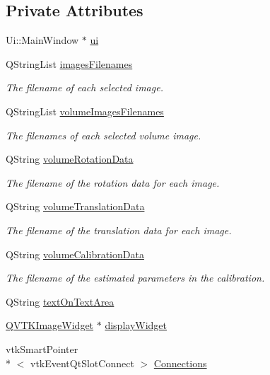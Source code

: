 \subsection*{Private Attributes}
\begin{DoxyCompactItemize}
\item 
Ui\-::\-Main\-Window $\ast$ \hyperlink{class_main_window_a35466a70ed47252a0191168126a352a5}{ui}
\item 
Q\-String\-List \hyperlink{class_main_window_a8b33f17919e8e99127a612476aefdaed}{images\-Filenames}
\begin{DoxyCompactList}\small\item\em The filename of each selected image. \end{DoxyCompactList}\item 
Q\-String\-List \hyperlink{class_main_window_a1a88d2961b59b38eb58bffeb1a6ffe39}{volume\-Images\-Filenames}
\begin{DoxyCompactList}\small\item\em The filenames of each selected volume image. \end{DoxyCompactList}\item 
Q\-String \hyperlink{class_main_window_ad2139711b6f91f541304b5dc5cf311ac}{volume\-Rotation\-Data}
\begin{DoxyCompactList}\small\item\em The filename of the rotation data for each image. \end{DoxyCompactList}\item 
Q\-String \hyperlink{class_main_window_aec94bc06393ad4a2fc014d71fbeddbd3}{volume\-Translation\-Data}
\begin{DoxyCompactList}\small\item\em The filename of the translation data for each image. \end{DoxyCompactList}\item 
Q\-String \hyperlink{class_main_window_ae44a1faf67f60347fd55e2ceebe874c3}{volume\-Calibration\-Data}
\begin{DoxyCompactList}\small\item\em The filename of the estimated parameters in the calibration. \end{DoxyCompactList}\item 
Q\-String \hyperlink{class_main_window_aac7c4f4184a77a56eef59fff591c9521}{text\-On\-Text\-Area}
\item 
\hyperlink{class_q_v_t_k_image_widget}{Q\-V\-T\-K\-Image\-Widget} $\ast$ \hyperlink{class_main_window_a79daf435968c77e526ddf286bcc86a8f}{display\-Widget}
\item 
vtk\-Smart\-Pointer\\*
$<$ vtk\-Event\-Qt\-Slot\-Connect $>$ \hyperlink{class_main_window_a2581229148c6c597849b827689e58a12}{Connections}
\end{DoxyCompactItemize}


